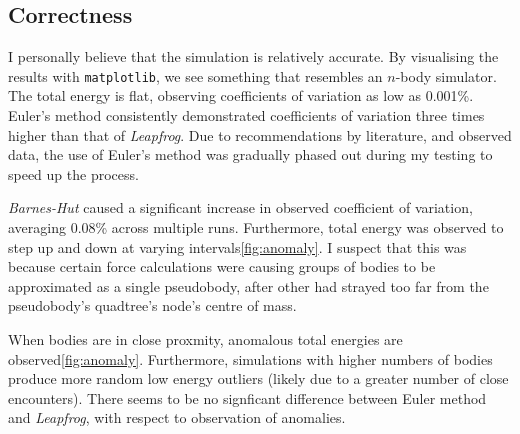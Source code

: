 \documentclass[11pt,a4paper]{article}
\begin{document}
\subsection*{Correctness}

I personally believe that the simulation is relatively accurate. By visualising the results with \texttt{matplotlib}, we see something that resembles an $n$-body simulator. The total energy is flat, observing coefficients of variation as low as 0.001\%. Euler's method consistently demonstrated coefficients of variation three times higher than that of \textit{Leapfrog}. Due to recommendations by literature, and observed data, the use of Euler's method was gradually phased out during my testing to speed up the process.

\textit{Barnes-Hut} caused a significant increase in observed coefficient of variation, averaging 0.08\% across multiple runs. Furthermore, total energy was observed to step up and down at varying intervals\ref{fig:anomaly}. I suspect that this was because certain force calculations were causing groups of bodies to be approximated as a single pseudobody, after other had strayed too far from the pseudobody's quadtree's node's centre of mass.

When bodies are in close proxmity, anomalous total energies are observed\ref{fig:anomaly}. Furthermore, simulations with higher numbers of bodies produce more random low energy outliers (likely due to a greater number of close encounters). There seems to be no signficant difference between Euler method and \textit{Leapfrog}, with respect to observation of anomalies.
\end{document}
